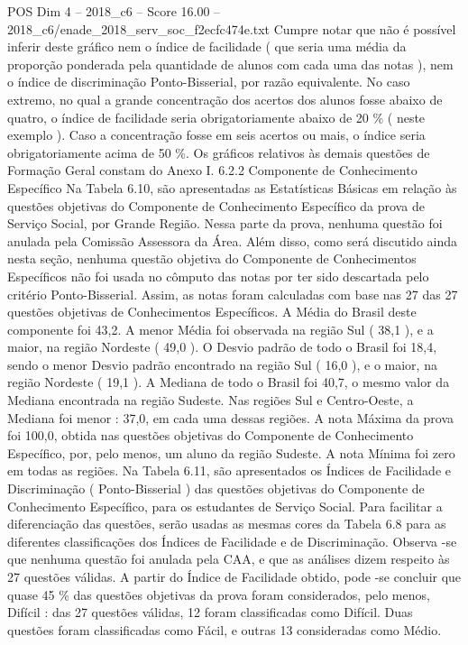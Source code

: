 \begin{textsample}{POS Dim 4 – 2018\_c6 – Score 16.00 – 2018\_c6/enade\_2018\_serv\_soc\_f2ecfc474e.txt}
Cumpre notar que não é possível inferir deste gráfico nem o índice de facilidade ( que seria uma média da proporção ponderada pela quantidade de alunos com cada uma das notas ), nem o índice de discriminação Ponto-Bisserial, por razão equivalente.
No caso extremo, no qual a grande concentração dos acertos dos alunos fosse abaixo de quatro, o índice de facilidade seria obrigatoriamente abaixo de 20 \% ( neste exemplo ).
Caso a concentração fosse em seis acertos ou mais, o índice seria obrigatoriamente acima de 50 \%.
Os gráficos relativos às demais questões de Formação Geral constam do Anexo I. 6.2.2 Componente de Conhecimento Específico Na Tabela 6.10, são apresentadas as Estatísticas Básicas em relação às questões objetivas do Componente de Conhecimento Específico da prova de Serviço Social, por Grande Região.
Nessa parte da prova, nenhuma questão foi anulada pela Comissão Assessora da Área.
Além disso, como será discutido ainda nesta seção, nenhuma questão objetiva do Componente de Conhecimentos Específicos não foi usada no cômputo das notas por ter sido descartada pelo critério Ponto-Bisserial.
Assim, as notas foram calculadas com base nas 27 das 27 questões objetivas de Conhecimentos Específicos.
A Média do Brasil deste componente foi 43,2.
A menor Média foi observada na região Sul ( 38,1 ), e a maior, na região Nordeste ( 49,0 ).
O Desvio padrão de todo o Brasil foi 18,4, sendo o menor Desvio padrão encontrado na região Sul ( 16,0 ), e o maior, na região Nordeste ( 19,1 ).
A Mediana de todo o Brasil foi 40,7, o mesmo valor da Mediana encontrada na região Sudeste.
Nas regiões Sul e Centro-Oeste, a Mediana foi menor : 37,0, em cada uma dessas regiões.
A nota Máxima da prova foi 100,0, obtida nas questões objetivas do Componente de Conhecimento Específico, por, pelo menos, um aluno da região Sudeste.
A nota Mínima foi zero em todas as regiões.
Na Tabela 6.11, são apresentados os Índices de Facilidade e Discriminação ( Ponto-Bisserial ) das questões objetivas do Componente de Conhecimento Específico, para os estudantes de Serviço Social.
Para facilitar a diferenciação das questões, serão usadas as mesmas cores da Tabela 6.8 para as diferentes classificações dos Índices de Facilidade e de Discriminação.
Observa -se que nenhuma questão foi anulada pela CAA, e que as análises dizem respeito às 27 questões válidas.
A partir do Índice de Facilidade obtido, pode -se concluir que quase 45 \% das questões objetivas da prova foram considerados, pelo menos, Difícil : das 27 questões válidas, 12 foram classificadas como Difícil.
Duas questões foram classificadas como Fácil, e outras 13 consideradas como Médio.

\end{textsample}
